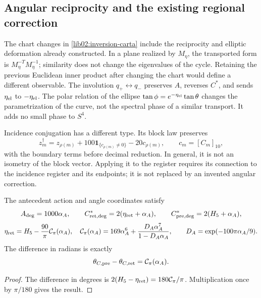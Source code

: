 \subsection{Angular reciprocity and the existing regional correction}
\label{lib02:correccion-regional}

The chart changes in \cref{lib02:inversion-carta} include the reciprocity and elliptic deformation already constructed. In a plane realized by \(M_\eta\), the transported form is \(M_\eta^{-T}M_\eta^{-1}\); similarity does not change the eigenvalues of the cycle. Retaining the previous Euclidean inner product after changing the chart would define a different observable. The involution \(q_+\leftrightarrow q_-\) preserves \(A\), reverses \(C^*\), and sends \(\eta_{\rm el}\) to \(-\eta_{\rm el}\). The polar relation of the ellipse \(\tan\phi=e^{-\eta_{\rm el}}\tan\theta\) changes the parametrization of the curve, not the spectral phase of a similar transport. It adds no small phase to \(S^4\).

Incidence conjugation has a different type. Its block law preserves
\[
 z_m^\dagger=z_{\rho(m)}
 +100\mathbf1_{\{c_{\rho(m)}\ne0\}}-20c_{\rho(m)},
 \qquad c_m=[C_m]_{10},
\]
with the boundary terms before decimal reduction. In general, it is not an isometry of the block vector. Applying it to the register requires its connection to the incidence register and its endpoints; it is not replaced by an invented angular correction.

\begin{proposition}
\label{lib02:retorno-regional}
The antecedent action and angle coordinates satisfy
\[
 A_{\rm deg}=1000\alpha_A,\qquad
 C^*_{\rm ret,deg}=2(\eta_{\rm ret}+\alpha_A),\qquad
 C^*_{\rm pre,deg}=2(H_5+\alpha_A),
\]
\[
 \eta_{\rm ret}=H_5-\frac{90}{\pi}\mathcal C_\pi(\alpha_A),
 \quad
 \mathcal C_\pi(\alpha_A)=169\alpha_A^6+
 \frac{D_A\alpha_A^7}{1-D_A\alpha_A},\qquad
 D_A=\exp(-100\pi\alpha_A/9).
\]
The difference in radians is exactly
\[
 \theta_{C,\rm pre}-\theta_{C,\rm ret}=\mathcal C_\pi(\alpha_A).
\]
\end{proposition}
\begin{proof}
The difference in degrees is \(2(H_5-\eta_{\rm ret})=180\mathcal C_\pi/\pi\). Multiplication once by \(\pi/180\) gives the result.
\end{proof}


